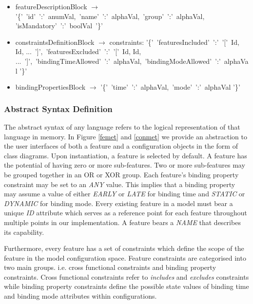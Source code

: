 \documentclass[conference]{IEEEtran}
\begin{document}
\begin{itemize}
	\item[] featureDescriptionBlock $\longrightarrow$ '\{'\ 'id'\ ':'\ anumVal,\ 'name'\ ':'\ alphaVal,\ 'group'\ ':'\ alphaVal, 'isMandatory'\ ':'\ boolVal\ '\}' \\
	
	\item[] constraintsDefinitionBlock $\longrightarrow$ constraints: '\{'\ 'featuresIncluded'\ ':'\ '['\ Id, Id, ...\ ']',\ 'featuresExcluded'\ ':'\ '['\ Id, Id, ...\ ']',\ 'bindingTimeAllowed'\ ':'\ alphaVal,\ 'bindingModeAllowed'\ ':'\ alphaVal '\}'\\
	
	\item[] bindingPropertiesBlock $\longrightarrow$ '\{'\ 'time'\ ':'\ alphaVal,\ 'mode'\ ':'\ alphaVal '\}'\\
\end{itemize}

\subsubsection{Abstract Syntax Definition}
The abstract syntax of any language refers to the logical representation of that language in memory. In Figure \ref{femet} and \ref{conmet} we provide an abstraction to the user interfaces of both a feature and a configuration objects in the form of class diagrams. Upon instantiation, a feature is selected by default. A feature has the potential of having zero or more sub-features. Two or more sub-features may be grouped together in an OR or XOR group. Each feature's binding property constraint may be set to an \textit{ANY} value. This implies that a binding property may assume a value of either \textit{EARLY} or \textit{LATE} for binding time and \textit{STATIC} or \textit{DYNAMIC} for binding mode. Every existing feature in a model must bear a unique \textit{ID} attribute which serves as a reference point for each feature throughout multiple points in our implementation. A feature bears a \textit{NAME} that describes its capability. 

Furthermore, every feature has a set of constraints which define the scope of the feature in the model configuration space. Feature constraints are categorised into two main groups. i.e. cross functional constraints and binding property constraints.  Cross functional constraints refer to \textit{includes} and \textit{excludes} constraints while binding property constraints define the possible state values of binding time and binding mode attributes within configurations.
\end{document}
